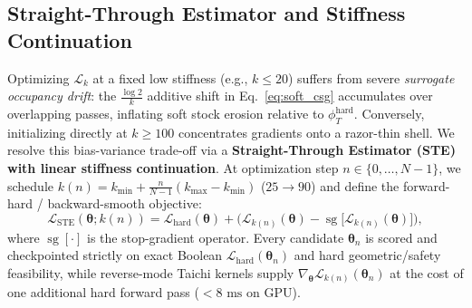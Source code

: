 \documentclass[conference]{IEEEtran}
\begin{document}
\subsection{Straight-Through Estimator and Stiffness Continuation}
Optimizing $\mathcal{L}_k$ at a fixed low stiffness (e.g., $k \le 20$) suffers from severe \emph{surrogate occupancy drift}: the $\frac{\log 2}{k}$ additive shift in Eq.~\eqref{eq:soft_csg} accumulates over overlapping passes, inflating soft stock erosion relative to $\phi_T^{\text{hard}}$. Conversely, initializing directly at $k \ge 100$ concentrates gradients onto a razor-thin shell. We resolve this bias-variance trade-off via a \textbf{Straight-Through Estimator (STE) with linear stiffness continuation}. At optimization step $n \in \{0,\dots,N-1\}$, we schedule $k(n) = k_{\min} + \frac{n}{N-1}(k_{\max} - k_{\min})$ ($25 \to 90$) and define the forward-hard / backward-smooth objective:
\begin{equation}
  \mathcal{L}_{\text{STE}}(\boldsymbol{\theta}; k(n)) = \mathcal{L}_{\text{hard}}(\boldsymbol{\theta}) + \Big(\mathcal{L}_{k(n)}(\boldsymbol{\theta}) - \operatorname{sg}\!\big[\mathcal{L}_{k(n)}(\boldsymbol{\theta})\big]\Big),
  \label{eq:ste}
\end{equation}
where $\operatorname{sg}[\cdot]$ is the stop-gradient operator. Every candidate $\boldsymbol{\theta}_n$ is scored and checkpointed strictly on exact Boolean $\mathcal{L}_{\text{hard}}(\boldsymbol{\theta}_n)$ and hard geometric/safety feasibility, while reverse-mode Taichi kernels supply $\nabla_{\boldsymbol{\theta}} \mathcal{L}_{k(n)}(\boldsymbol{\theta}_n)$ at the cost of one additional hard forward pass ($<8\text{ ms}$ on GPU).
\end{document}
